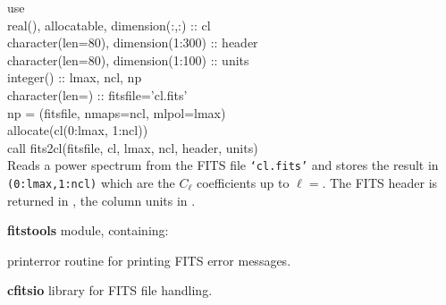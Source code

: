 \begin{example}
{
use \\
real(), allocatable, dimension(:,:) :: cl \\
character(len=80), dimension(1:300) :: header \\
character(len=80), dimension(1:100) :: units \\
integer() :: lmax, ncl, np \\
character(len=) :: fitsfile='cl.fits' \\
np = (fitsfile, nmaps=ncl, mlpol=lmax) \\
allocate(cl(0:lmax, 1:ncl)) \\
call fits2cl(fitsfile, cl, lmax, ncl, header, units)  \\
}
{
Reads a power spectrum from the FITS file {\tt `cl.fits'} and stores the result in 
{\tt {}(0:lmax,1:ncl)} 
which are the  $C_\ell$ coefficients up to 
$\ell=$. 
The FITS header is returned in , 
the column units in .
}
\end{example}
\begin{modules}
  \begin{sulist}{} %
  \item[\textbf{fitstools}] module, containing:
  \item[printerror] routine for printing FITS error messages.
  \item[\textbf{cfitsio}] library for FITS file handling.		
  \end{sulist}
\end{modules}

